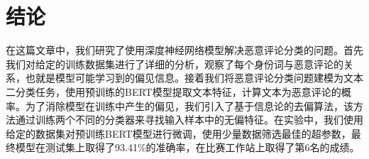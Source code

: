 \section{结论}

在这篇文章中，我们研究了使用深度神经网络模型解决恶意评论分类的问题。首先我们对给定的训练数据集进行了详细的分析，观察了每个身份词与恶意评论的关系，也就是模型可能学习到的偏见信息。接着我们将恶意评论分类问题建模为文本二分类任务，使用预训练的BERT模型提取文本特征，计算文本为恶意评论的概率。为了消除模型在训练中产生的偏见，我们引入了基于信息论的去偏算法，该方法通过训练两个不同的分类器来寻找输入样本中的无偏特征。在实验中，我们使用给定的数据集对预训练BERT模型进行微调，使用少量数据筛选最佳的超参数，最终模型在测试集上取得了93.41\%的准确率，在比赛工作站上取得了第6名的成绩。
